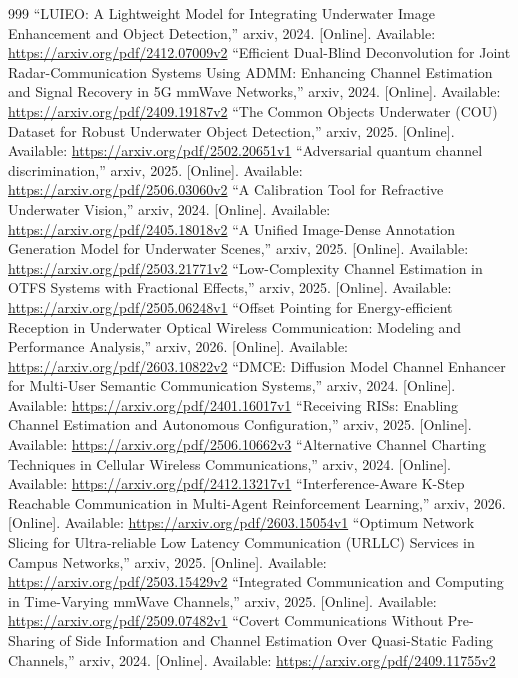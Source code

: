 \documentclass[10pt,journal]{IEEEtran}
\begin{document}
\begin{thebibliography}{999}
 ``LUIEO: A Lightweight Model for Integrating Underwater Image Enhancement and Object Detection,'' arxiv, 2024. [Online]. Available: \url{https://arxiv.org/pdf/2412.07009v2}
 ``Efficient Dual-Blind Deconvolution for Joint Radar-Communication Systems Using ADMM: Enhancing Channel Estimation and Signal Recovery in 5G mmWave Networks,'' arxiv, 2024. [Online]. Available: \url{https://arxiv.org/pdf/2409.19187v2}
 ``The Common Objects Underwater (COU) Dataset for Robust Underwater Object Detection,'' arxiv, 2025. [Online]. Available: \url{https://arxiv.org/pdf/2502.20651v1}
 ``Adversarial quantum channel discrimination,'' arxiv, 2025. [Online]. Available: \url{https://arxiv.org/pdf/2506.03060v2}
 ``A Calibration Tool for Refractive Underwater Vision,'' arxiv, 2024. [Online]. Available: \url{https://arxiv.org/pdf/2405.18018v2}
 ``A Unified Image-Dense Annotation Generation Model for Underwater Scenes,'' arxiv, 2025. [Online]. Available: \url{https://arxiv.org/pdf/2503.21771v2}
 ``Low-Complexity Channel Estimation in OTFS Systems with Fractional Effects,'' arxiv, 2025. [Online]. Available: \url{https://arxiv.org/pdf/2505.06248v1}
 ``Offset Pointing for Energy-efficient Reception in Underwater Optical Wireless Communication: Modeling and Performance Analysis,'' arxiv, 2026. [Online]. Available: \url{https://arxiv.org/pdf/2603.10822v2}
 ``DMCE: Diffusion Model Channel Enhancer for Multi-User Semantic Communication Systems,'' arxiv, 2024. [Online]. Available: \url{https://arxiv.org/pdf/2401.16017v1}
 ``Receiving RISs: Enabling Channel Estimation and Autonomous Configuration,'' arxiv, 2025. [Online]. Available: \url{https://arxiv.org/pdf/2506.10662v3}
 ``Alternative Channel Charting Techniques in Cellular Wireless Communications,'' arxiv, 2024. [Online]. Available: \url{https://arxiv.org/pdf/2412.13217v1}
 ``Interference-Aware K-Step Reachable Communication in Multi-Agent Reinforcement Learning,'' arxiv, 2026. [Online]. Available: \url{https://arxiv.org/pdf/2603.15054v1}
 ``Optimum Network Slicing for Ultra-reliable Low Latency Communication (URLLC) Services in Campus Networks,'' arxiv, 2025. [Online]. Available: \url{https://arxiv.org/pdf/2503.15429v2}
 ``Integrated Communication and Computing in Time-Varying mmWave Channels,'' arxiv, 2025. [Online]. Available: \url{https://arxiv.org/pdf/2509.07482v1}
 ``Covert Communications Without Pre-Sharing of Side Information and Channel Estimation Over Quasi-Static Fading Channels,'' arxiv, 2024. [Online]. Available: \url{https://arxiv.org/pdf/2409.11755v2}

\end{thebibliography}
\end{document}
